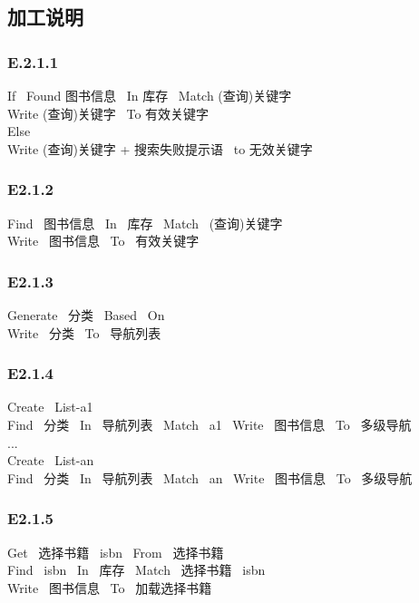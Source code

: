 \documentclass{article}
\begin{document}
\begin{CJK*}{UTF8}{gbsn}
\begin{itemize}
\end{itemize}


\vspace{-1mm}

\subsection{加工说明}
\subsubsection*{E.2.1.1}
If \ Found 图书信息 \ In 库存 \ Match (查询)关键字 \\
\indent Write (查询)关键字 \ To 有效关键字  \\
Else \\
\indent Write (查询)关键字 + 搜索失败提示语 \ to 无效关键字 \\
\vspace{-1mm}
\subsubsection*{E2.1.2}
Find \ 图书信息 \ In \ 库存 \ Match \ (查询)关键字\\ 
Write \ 图书信息 \ To \ 有效关键字\\ 
\vspace{-1mm}
\subsubsection*{E2.1.3}
Generate \ {分类} \ Based \ On\\ 
Write \ {分类} \ To \ 导航列表\\ 
\vspace{-1mm}
\subsubsection*{E2.1.4}
Create \ List-a1\\ 
Find \ 分类 \ In \ 导航列表 \ Match \ a1 \ Write \ 图书信息 \ To \ 多级导航\\ 
... \\ 
Create \ List-an\\ 
Find \ 分类 \ In \ 导航列表 \ Match \ an \ Write \ 图书信息 \ To \ 多级导航\\ 
\vspace{-1mm}
\subsubsection*{E2.1.5}
Get \ 选择书籍 \ isbn \ From \ 选择书籍 \\ 
Find \ isbn \ In \ 库存 \ Match \ 选择书籍 \ isbn \\ 
Write \ 图书信息 \ To \ 加载选择书籍\\ 
\vspace{-1mm}

\end{CJK*}
\end{document}
